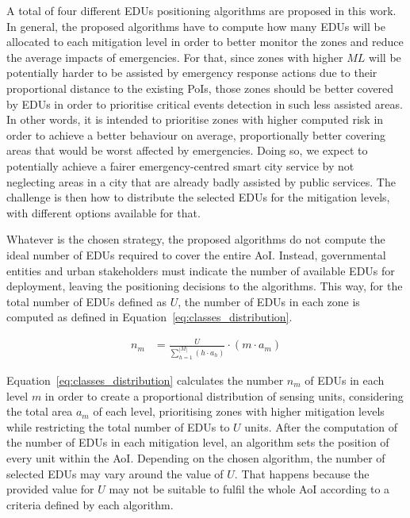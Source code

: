 \begin{refsection}
A total of four different EDUs positioning algorithms are proposed in this work. In general, the proposed algorithms have to compute how many EDUs will be allocated to each mitigation level in order to better monitor the zones and reduce the average impacts of emergencies. For that, since zones with higher $ML$ will be potentially harder to be assisted by emergency response actions due to their proportional distance to the existing PoIs, those zones should be better covered by EDUs in order to prioritise critical events detection in such less assisted areas. In other words, it is intended to prioritise zones with higher computed risk in order to achieve a better behaviour on average, proportionally better covering areas that would be worst affected by emergencies. Doing so, we expect to potentially achieve a fairer emergency-centred smart city service by not neglecting areas in a city that are already badly assisted by public services. The challenge is then how to distribute the selected EDUs for the mitigation levels, with different options available for that.

Whatever is the chosen strategy, the proposed algorithms do not compute the ideal number of EDUs required to cover the entire AoI. Instead, governmental entities and urban stakeholders must indicate the number of available EDUs for deployment, leaving the positioning decisions to the algorithms. This way, for the total number of EDUs defined as $U$, the number of EDUs in each zone is computed as defined in Equation~\ref{eq:classes_distribution}.

\begin{equation}
  \label{eq:classes_distribution}
  \begin{split}
    \displaystyle n_m &= \frac{U}{\displaystyle\sum_{h = 1}^{|M|}\left(h \cdot a_h\right)} \cdot (m \cdot a_m)
  \end{split}
\end{equation}

Equation~\ref{eq:classes_distribution} calculates the number $n_m$ of EDUs in each level $m$ in order to create a proportional distribution of sensing units, considering the total area $a_m$ of each level, prioritising zones with higher mitigation levels while restricting the total number of EDUs to $U$ units. After the computation of the number of EDUs in each mitigation level, an algorithm sets the position of every unit within the AoI. Depending on the chosen algorithm, the number of selected EDUs may vary around the value of $U$. That happens because the provided value for $U$ may not be suitable to fulfil the whole AoI according to a criteria defined by each algorithm.


\end{refsection}
